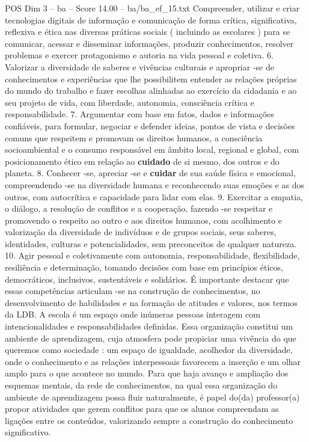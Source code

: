 \begin{textsample}{POS Dim 3 – ba – Score 14.00 – ba/ba\_ef\_15.txt}
Compreender, utilizar e criar tecnologias digitais de informação e comunicação de forma crítica, significativa, reflexiva e ética nas diversas práticas sociais ( incluindo as escolares ) para se comunicar, acessar e disseminar informações, produzir conhecimentos, resolver problemas e exercer protagonismo e autoria na vida pessoal e coletiva. 6.
Valorizar a diversidade de saberes e vivências culturais e apropriar -se de conhecimentos e experiências que lhe possibilitem entender as relações próprias do mundo do trabalho e fazer escolhas alinhadas ao exercício da cidadania e ao seu projeto de vida, com liberdade, autonomia, consciência crítica e responsabilidade. 7.
Argumentar com base em fatos, dados e informações confiáveis, para formular, negociar e defender ideias, pontos de vista e decisões comuns que respeitem e promovam os direitos humanos, a consciência socioambiental e o consumo responsável em âmbito local, regional e global, com posicionamento ético em relação ao \textbf{cuidado} de si mesmo, dos outros e do planeta. 8.
Conhecer -se, apreciar -se e \textbf{cuidar} de sua saúde física e emocional, compreendendo -se na diversidade humana e reconhecendo suas emoções e as dos outros, com autocrítica e capacidade para lidar com elas. 9.
Exercitar a empatia, o diálogo, a resolução de conflitos e a cooperação, fazendo -se respeitar e promovendo o respeito ao outro e aos direitos humanos, com acolhimento e valorização da diversidade de indivíduos e de grupos sociais, seus saberes, identidades, culturas e potencialidades, sem preconceitos de qualquer natureza. 10.
Agir pessoal e coletivamente com autonomia, responsabilidade, flexibilidade, resiliência e determinação, tomando decisões com base em princípios éticos, democráticos, inclusivos, sustentáveis e solidários.
É importante destacar que essas competências articulam -se na construção de conhecimentos, no desenvolvimento de habilidades e na formação de atitudes e valores, nos termos da LDB.
A escola é um espaço onde inúmeras pessoas interagem com intencionalidades e responsabilidades definidas.
Essa organização constitui um ambiente de aprendizagem, cuja atmosfera pode propiciar uma vivência do que queremos como sociedade : um espaço de igualdade, acolhedor da diversidade, onde o conhecimento e as relações interpessoais favorecem a inserção e um olhar amplo para o que acontece no mundo.
Para que haja avanço e ampliação dos esquemas mentais, da rede de conhecimentos, na qual essa organização do ambiente de aprendizagem possa fluir naturalmente, é papel do(da) professor(a) propor atividades que gerem conflitos para que os alunos compreendam as ligações entre os conteúdos, valorizando sempre a construção do conhecimento significativo.

\end{textsample}
